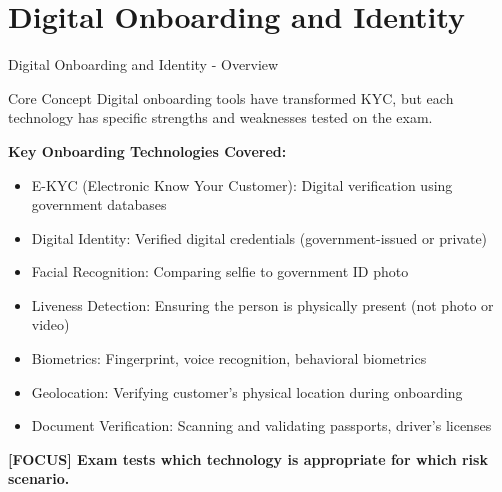 \documentclass[11pt,a4paper]{beamer}
\newcommand{\examfocus}[1]{\textcolor{orange!80!black}{\textbf{[FOCUS] #1}}}
\begin{document}
	\section{Digital Onboarding and Identity}
	
	\begin{frame}{Digital Onboarding and Identity - Overview}
		\begin{block}{Core Concept}
			Digital onboarding tools have transformed KYC, but each technology has specific strengths and weaknesses tested on the exam.
		\end{block}
		
		\textbf{Key Onboarding Technologies Covered:}
		\begin{itemize}
			\item E-KYC (Electronic Know Your Customer): Digital verification using government databases
			\item Digital Identity: Verified digital credentials (government-issued or private)
			\item Facial Recognition: Comparing selfie to government ID photo
			\item Liveness Detection: Ensuring the person is physically present (not photo or video)
			\item Biometrics: Fingerprint, voice recognition, behavioral biometrics
			\item Geolocation: Verifying customer's physical location during onboarding
			\item Document Verification: Scanning and validating passports, driver's licenses
		\end{itemize}
		
		\examfocus{Exam tests which technology is appropriate for which risk scenario.}
	\end{frame}
	
\end{document}
